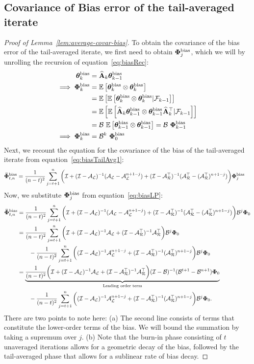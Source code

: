 \subsection{Covariance of Bias error of the tail-averaged iterate}
\begin{proof}[Proof of Lemma~\ref{lem:average-covar-bias}]
To obtain the covariance of the bias error of the tail-averaged iterate, we first need to obtain $\boldsymbol{\Phi}_j^{\text{bias}}$, which we will by unrolling the recursion of equation~\ref{eq:biasRec}:
\begin{align}
\label{eq:biasLP}
\thetav_k^{\text{bias}}&= \Ah_k\thetav_{k-1}^{\text{bias}}\nonumber\\
\implies \phiv_{k}^{\text{bias}} &=\E{\thetav_k^{\text{bias}}\otimes\thetav_k^{\text{bias}}}\nonumber\\
&=\E{\E{\thetav_k^{\text{bias}}\otimes\thetav_k^{\text{bias}}|\mathcal{F}_{k-1}}}\nonumber\\
&=\E{\E{\Ah_k\thetav_{k-1}^{\text{bias}}\otimes\thetav_{k-1}^{\text{bias}}\Ah_k\T|\mathcal{F}_{k-1}}}\nonumber\\
&=\BT\ \E{\thetav_{k-1}^{\text{bias}}\otimes\thetav_{k-1}^{\text{bias}}}=\BT\ \phiv_{k-1}^{\text{bias}}\nonumber\\
\implies\phiv_{k}^{\text{bias}}&=\BT^k\ \phiv_{0}^{\text{bias}}
\end{align}
Next, we recount the equation for the covariance of the bias of the tail-averaged iterate from equation~\ref{eq:biasTailAvg1}:
\begin{align*}
\boldsymbol{\bar{\Phi}}_{t,n}^{\text{bias}}&=\frac{1}{(n-t)^2}\sum_{j=t+1}^n\bigg( \mathcal{I} + (\mathcal{I}-\mathcal{A}_{\mathcal{L}})^{-1}(\mathcal{A}_{\mathcal{L}}-\mathcal{A}_{\mathcal{L}}^{n+1-j}) + (\mathcal{I}-\mathcal{A}_{\mathcal{R}}^{\top})^{-1}(\mathcal{A}_{\mathcal{R}}^{\top}-(\mathcal{A}_{\mathcal{R}}^{\top})^{n+1-j}) \bigg)\boldsymbol{\Phi}_j^{\text{bias}}
\end{align*}
Now, we substitute $\boldsymbol{\Phi}_j^{\text{bias}}$ from equation~\ref{eq:biasLP}:
\begin{align}
\label{eq:biasTA}
\boldsymbol{\bar{\Phi}}_{t,n}^{\text{bias}}&=\frac{1}{(n-t)^2}\sum_{j=t+1}^n\bigg( \mathcal{I} + (\mathcal{I}-\mathcal{A}_{\mathcal{L}})^{-1}(\mathcal{A}_{\mathcal{L}}-\mathcal{A}_{\mathcal{L}}^{n+1-j}) + (\mathcal{I}-\mathcal{A}_{\mathcal{R}}^{\top})^{-1}(\mathcal{A}_{\mathcal{R}}^{\top}-(\mathcal{A}_{\mathcal{R}}^{\top})^{n+1-j}) \bigg)\mathcal{B}^j\boldsymbol{\Phi}_0\nonumber\\
&=\frac{1}{(n-t)^2}\sum_{j=t+1}^n\bigg( \mathcal{I} + (\mathcal{I}-\mathcal{A}_{\mathcal{L}})^{-1}\mathcal{A}_{\mathcal{L}} + (\mathcal{I}-\mathcal{A}_{\mathcal{R}}^{\top})^{-1}\mathcal{A}_{\mathcal{R}}^{\top}\bigg)\mathcal{B}^j\boldsymbol{\Phi}_0\nonumber\\
&\qquad-\frac{1}{(n-t)^2}\sum_{j=t+1}^n\bigg( (\mathcal{I}-\mathcal{A}_{\mathcal{L}})^{-1}\mathcal{A}_{\mathcal{L}}^{n+1-j} + (\mathcal{I}-\mathcal{A}_{\mathcal{R}}^{\top})^{-1}(\mathcal{A}_{\mathcal{R}}^{\top})^{n+1-j} \bigg)\mathcal{B}^j\boldsymbol{\Phi}_0\nonumber\\
&=\underbrace{\frac{1}{(n-t)^2}\bigg( \mathcal{I} + (\mathcal{I}-\mathcal{A}_{\mathcal{L}})^{-1}\mathcal{A}_{\mathcal{L}} + (\mathcal{I}-\mathcal{A}_{\mathcal{R}}^{\top})^{-1}\mathcal{A}_{\mathcal{R}}^{\top}\bigg)(\mathcal{I}-\mathcal{B})^{-1}(\mathcal{B}^{t+1}-\mathcal{B}^{n+1})\boldsymbol{\Phi}_0}_{\text{Leading order term}}\nonumber\\
&\qquad-\frac{1}{(n-t)^2}\sum_{j=t+1}^n\bigg( (\mathcal{I}-\mathcal{A}_{\mathcal{L}})^{-1}\mathcal{A}_{\mathcal{L}}^{n+1-j} + (\mathcal{I}-\mathcal{A}_{\mathcal{R}}^{\top})^{-1}(\mathcal{A}_{\mathcal{R}}^{\top})^{n+1-j} \bigg)\mathcal{B}^j\boldsymbol{\Phi}_0.
\end{align}
There are two points to note here: (a) The second line consists of terms that constitute the lower-order terms of the bias. We will bound the summation by taking a supremum over $j$. (b) Note that the burn-in phase consisting of $t$ unaveraged iterations allows for a geometric decay of the bias, followed by the tail-averaged phase that allows for a sublinear rate of bias decay. 
\end{proof}
